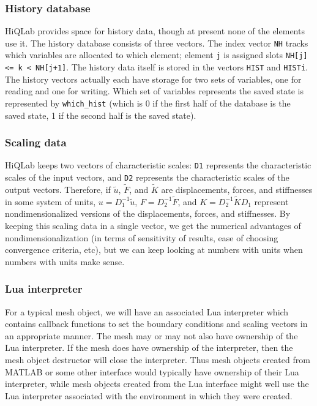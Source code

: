 \subsubsection{History database}

HiQLab provides space for history data, though at present none of
the elements use it.  The history database consists of three
vectors.  The index vector {\tt NH} tracks which variables are
allocated to which element; element {\tt j} is assigned slots 
{\tt NH[j] <= k < NH[j+1]}.  The history data itself is stored in the
vectors {\tt HIST} and {\tt HISTi}.  The history vectors actually
each have storage for two sets of variables, one for reading and
one for writing.  Which set of variables represents the saved state
is represented by {\tt which\_hist} (which is 0 if the first half
of the database is the saved state, 1 if the second half is the
saved state).


\subsubsection{Scaling data}

HiQLab keeps two vectors of characteristic scales: {\tt D1}
represents the characteristic scales of the input vectors, and 
{\tt D2} represents the characteristic scales of the output vectors.
Therefore, if $\tilde{u}$, $\tilde{F}$, and $\tilde{K}$ are
displacements, forces, and stiffnesses in some system of units,
$u = D_1^{-1} \tilde{u}$, $F = D_2^{-1} \tilde{F}$, and $K =
D_2^{-1} \tilde{K} D_1$ represent nondimensionalized versions of
the displacements, forces, and stiffnesses.  By keeping this
scaling data in a single vector, we get the numerical advantages of
nondimensionalization (in terms of sensitivity of results, ease of
choosing convergence criteria, etc), but we can keep looking at
numbers with units when numbers with units make sense.


\subsubsection{Lua interpreter}

For a typical mesh object, we will have an associated Lua
interpreter which contains callback functions to set the boundary
conditions and scaling vectors in an appropriate manner.
The mesh may or may not also have ownership of the Lua interpreter.
If the mesh does have ownership of the interpreter, then the mesh
object destructor will close the interpreter.  Thus mesh objects
created from MATLAB or some other interface would typically have
ownership of their Lua interpreter, while mesh objects created from
the Lua interface might well use the Lua interpreter associated
with the environment in which they were created.
